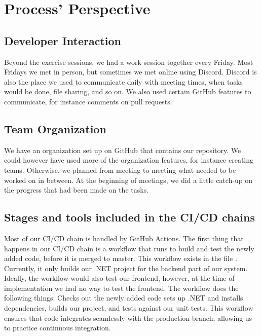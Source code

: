 \chapter{Process' Perspective}

\section{Developer Interaction}
Beyond the exercise sessions, we had a work session together every Friday. Most Fridays we met in person, but sometimes we met online using Discord. Discord is also the place we used to communicate daily with meeting times, when tasks would be done, file sharing, and so on. We also used certain GitHub features to communicate, for instance comments on pull requests.

\section{Team Organization}
We have an organization set up on GitHub that contains our repository. We could however have used more of the organization features, for instance creating teams. Otherwise, we planned from meeting to meeting what needed to be worked on in between. At the beginning of meetings, we did a little catch-up on the progress that had been made on the tasks.

\section{Stages and tools included in the CI/CD chains}
Most of our CI/CD chain is handled by GitHub Actions. The first thing that happens in our CI/CD chain is a workflow that runs to build and test the newly added code, before it is merged to master. This workflow exists in the file . Currently, it only builds our .NET project for the backend part of our system. Ideally, the workflow would also test our frontend, however, at the time of implementation we had no way to test the frontend. The  workflow does the following things: Checks out the newly added code sets up .NET and installs dependencies, builds our project, and tests against our unit tests. This workflow ensures that code integrates seamlessly with the production branch, allowing us to practice continuous integration.\\

